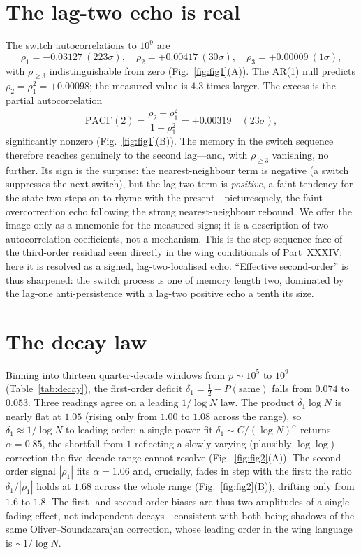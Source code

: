 \documentclass[11pt]{article}
\begin{document}
\section{The lag-two echo is real}
The switch autocorrelations to $10^{9}$ are
\[
\rho_1=-0.03127\ (223\sigma),\quad \rho_2=+0.00417\ (30\sigma),\quad \rho_3=+0.00009\ (1\sigma),
\]
with $\rho_{\ge3}$ indistinguishable from zero (Fig.~\ref{fig:fig1}(A)). The AR(1) null predicts
$\rho_2=\rho_1^2=+0.00098$; the measured value is $4.3$ times larger. The excess is the partial
autocorrelation
\[
\mathrm{PACF}(2)=\frac{\rho_2-\rho_1^2}{1-\rho_1^2}=+0.00319\quad(23\sigma),
\]
significantly nonzero (Fig.~\ref{fig:fig1}(B)). The memory in the switch sequence therefore reaches
genuinely to the second lag---and, with $\rho_{\ge3}$ vanishing, no further. Its sign is the surprise:
the nearest-neighbour term is negative (a switch suppresses the next switch), but the lag-two term is
\emph{positive}, a faint tendency for the state two steps on to rhyme with the present---picturesquely,
the faint overcorrection echo following the strong nearest-neighbour rebound. We offer the image only
as a mnemonic for the measured signs; it is a description of two autocorrelation coefficients, not a
mechanism. This is the
step-sequence face of the third-order residual seen directly in the wing conditionals of Part~XXXIV;
here it is resolved as a signed, lag-two-localised echo. ``Effective second-order'' is thus sharpened:
the switch process is one of memory length two, dominated by the lag-one anti-persistence with a
lag-two positive echo a tenth its size.

\section{The decay law}
Binning into thirteen quarter-decade windows from $p\sim10^{5}$ to $10^{9}$
(Table~\ref{tab:decay}), the first-order deficit $\delta_1=\tfrac12-P(\text{same})$ falls from
$0.074$ to $0.053$. Three readings agree on a leading $1/\log N$ law. The product $\delta_1\log N$ is
nearly flat at $1.05$ (rising only from $1.00$ to $1.08$ across the range), so $\delta_1\approx1/\log
N$ to leading order; a single power fit $\delta_1\sim C/(\log N)^{\alpha}$ returns $\alpha=0.85$, the
shortfall from $1$ reflecting a slowly-varying (plausibly $\log\log$) correction the five-decade range
cannot resolve (Fig.~\ref{fig:fig2}(A)). The second-order signal $|\rho_1|$ fits $\alpha=1.06$ and,
crucially, fades in step with the first: the ratio $\delta_1/|\rho_1|$ holds at $1.68$ across the whole
range (Fig.~\ref{fig:fig2}(B)), drifting only from $1.6$ to $1.8$. The first- and second-order biases
are thus two amplitudes of a single fading effect, not independent decays---consistent with both being
shadows of the same Oliver--Soundararajan correction, whose leading order in the wing language is
$\sim1/\log N$.
\end{document}
